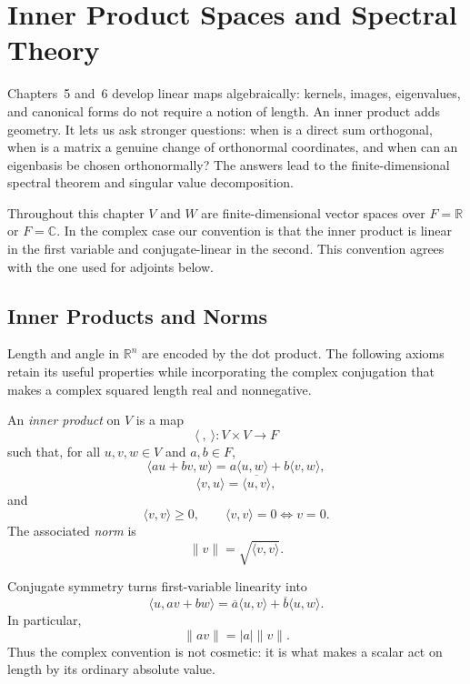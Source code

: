 \chapter{Inner Product Spaces and Spectral Theory}\label{chap:inner-products-spectral-theory}
Chapters~5 and~6 develop linear maps algebraically: kernels, images,
eigenvalues, and canonical forms do not require a notion of length. An inner
product adds geometry. It lets us ask stronger questions: when is a direct
sum orthogonal, when is a matrix a genuine change of orthonormal coordinates,
and when can an eigenbasis be chosen orthonormally? The answers lead to the
finite-dimensional spectral theorem and singular value decomposition.

Throughout this chapter \(V\) and \(W\) are finite-dimensional vector spaces
over \(F=\mathbb R\) or \(F=\mathbb C\). In the complex case our convention is
that the inner product is linear in the first variable and conjugate-linear in
the second. This convention agrees with the one used for adjoints below.

\section{Inner Products and Norms}

Length and angle in \(\mathbb R^n\) are encoded by the dot product. The
following axioms retain its useful properties while incorporating the complex
conjugation that makes a complex squared length real and nonnegative.

\begin{definition}
An \emph{inner product} on \(V\) is a map
\[
\langle\ ,\ \rangle:V\times V\longrightarrow F
\]
such that, for all \(u,v,w\in V\) and \(a,b\in F\),
\[
\langle au+bv,w\rangle
=a\langle u,w\rangle+b\langle v,w\rangle,
\]
\[
\langle v,u\rangle=\overline{\langle u,v\rangle},
\]
and
\[
\langle v,v\rangle\geq0,
\qquad
\langle v,v\rangle=0\Longleftrightarrow v=0.
\]
The associated \emph{norm} is
\[
\lVert v\rVert=\sqrt{\langle v,v\rangle}.
\]
\end{definition}

Conjugate symmetry turns first-variable linearity into
\[
\langle u,av+bw\rangle
=\overline a\langle u,v\rangle+\overline b\langle u,w\rangle.
\]
In particular,
\[
\lVert av\rVert=|a|\lVert v\rVert.
\]
Thus the complex convention is not cosmetic: it is what makes a scalar act
on length by its ordinary absolute value.

